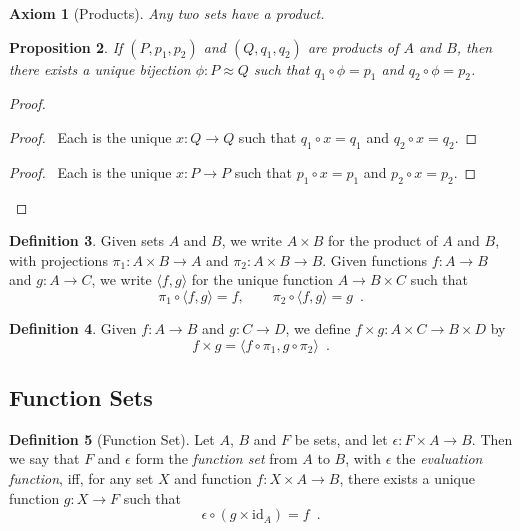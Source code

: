 \documentclass{book}
\let\qed\relax
\newtheorem{prop}{Proposition}[chapter]
\newtheorem{ax}[prop]{Axiom}
\theoremstyle{definition}
\newtheorem{df}[prop]{Definition}
\newcommand{\id}[1]{\ensuremath{\mathrm{id}_{#1}}}
\begin{document}
\begin{ax}[Products]
Any two sets have a product.
\end{ax}

\begin{prop}
If $(P, p_1, p_2)$ and $(Q, q_1, q_2)$ are products of $A$ and $B$, then there exists a unique bijection $\phi : P \approx Q$ such that $q_1 \circ \phi = p_1$ and $q_2 \circ \phi = p_2$.
\end{prop}

\begin{proof}
\pf
{}
\step{3}{$\phi \circ \phi^{-1} = \id{Q}$}
\begin{proof}
	\pf\ Each is the unique $x : Q \rightarrow Q$ such that $q_1 \circ x = q_1$ and $q_2 \circ x = q_2$.
\end{proof}
\step{4}{$\phi^{-1} \circ \phi = \id{P}$}
\begin{proof}
	\pf\ Each is the unique $x : P \rightarrow P$ such that $p_1 \circ x = p_1$ and $p_2 \circ x = p_2$.
\end{proof}
\qed
\end{proof}

\begin{df}
Given sets $A$ and $B$, we write $A \times B$ for the product of $A$ and $B$, with projections $\pi_1 : A \times B \rightarrow A$ and $\pi_2 : A \times B \rightarrow B$. Given functions $f : A \rightarrow B$ and $g : A \rightarrow C$, we write $\langle f,g \rangle$ for the unique function $A \rightarrow B \times C$ such that
\[ \pi_1 \circ \langle f,g \rangle = f, \qquad \pi_2 \circ \langle f,g \rangle = g \enspace . \]
\end{df}

\begin{df}
Given $f : A \rightarrow B$ and $g : C \rightarrow D$, we define $f \times g : A \times C \rightarrow B \times D$ by
\[ f \times g = \langle f \circ \pi_1, g \circ \pi_2 \rangle \enspace . \]
\end{df}

\subsection{Function Sets}

\begin{df}[Function Set]
Let $A$, $B$ and $F$ be sets, and let $\epsilon : F \times A \rightarrow B$. Then we say that $F$ and $\epsilon$ form the \emph{function set} from $A$ to $B$, with $\epsilon$ the \emph{evaluation function}, iff, for any set $X$ and function $f : X \times A \rightarrow B$, there exists a unique function $g : X \rightarrow F$ such that
\[ \epsilon \circ (g \times \id{A}) = f \enspace . \]
\end{df}
\end{document}

